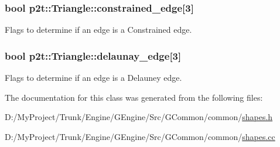 \subsubsection[{constrained\+\_\+edge}]{\setlength{\rightskip}{0pt plus 5cm}bool p2t\+::\+Triangle\+::constrained\+\_\+edge\mbox{[}3\mbox{]}}\label{classp2t_1_1_triangle_a66aea3f70ccfd359372cb747581f1653}


Flags to determine if an edge is a Constrained edge. 

\hypertarget{classp2t_1_1_triangle_acbfdd0dba623a7b5d1dc8b81059c48b5}{}
\subsubsection[{delaunay\+\_\+edge}]{\setlength{\rightskip}{0pt plus 5cm}bool p2t\+::\+Triangle\+::delaunay\+\_\+edge\mbox{[}3\mbox{]}}\label{classp2t_1_1_triangle_acbfdd0dba623a7b5d1dc8b81059c48b5}


Flags to determine if an edge is a Delauney edge. 



The documentation for this class was generated from the following files\+:\begin{DoxyCompactItemize}
\item 
D\+:/\+My\+Project/\+Trunk/\+Engine/\+G\+Engine/\+Src/\+G\+Common/common/\hyperlink{shapes_8h}{shapes.\+h}\item 
D\+:/\+My\+Project/\+Trunk/\+Engine/\+G\+Engine/\+Src/\+G\+Common/common/\hyperlink{shapes_8cc}{shapes.\+cc}\end{DoxyCompactItemize}
